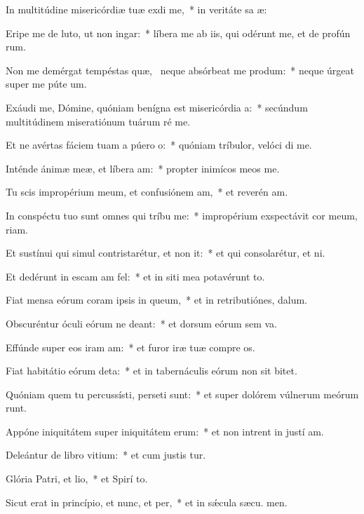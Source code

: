 \item In multitúdine misericórdiæ tuæ exdi me,~* in veritáte sa æ:
\item Eripe me de luto, ut non ingar:~* líbera me ab iis, qui odérunt me, et de profún rum.
\item Non me demérgat tempéstas quæ,~\pscross{} neque absórbeat me produm:~* neque úrgeat super me púte  um.
\item Exáudi me, Dómine, quóniam benígna est misericórdia a:~* secúndum multitúdinem miseratiónum tuárum ré  me.
\item Et ne avértas fáciem tuam a púero o:~* quóniam tríbulor, velóci di me.
\item Inténde ánimæ meæ, et líbera am:~* propter inimícos meos  me.
\item Tu scis impropérium meum, et confusiónem am,~* et reverén am.
\item In conspéctu tuo sunt omnes qui tríbu me:~* impropérium exspectávit cor meum,  riam.
\item Et sustínui qui simul contristarétur, et non it:~* et qui consolarétur, et  ni.
\item Et dedérunt in escam am fel:~* et in siti mea potavérunt  to.
\item Fiat mensa eórum coram ipsis in queum,~* et in retributiónes,   dalum.
\item Obscuréntur óculi eórum ne deant:~* et dorsum eórum sem va.
\item Effúnde super eos iram am:~* et furor iræ tuæ compre os.
\item Fiat habitátio eórum deta:~* et in tabernáculis eórum non sit  bitet.
\item Quóniam quem tu percussísti, perseti sunt:~* et super dolórem vúlnerum meórum runt.
\item Appóne iniquitátem super iniquitátem erum:~* et non intrent in justí am.
\item Deleántur de libro vitium:~* et cum justis  tur.
\item Glória Patri, et lio,~* et Spirí to.
\item Sicut erat in princípio, et nunc, et per,~* et in sǽcula sæcu. men.
